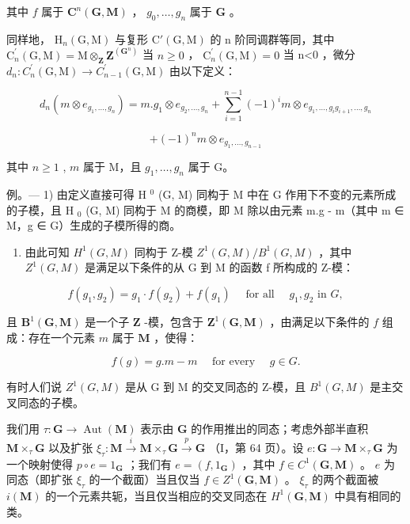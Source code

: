 其中 \(f\) 属于 \(\mathbf{C}^{n}(\mathbf{G},\mathbf{M})\) ， \(g_{0},\ldots,g_{n}\) 属于 \(\mathbf{G}\) 。

同样地， \(\mathrm{H}_{n}(\mathrm{G},\mathrm{M})\) 与复形 \(\mathrm{C}'(\mathrm{G},\mathrm{M})\) 的 n 阶同调群等同，其中 \(\mathrm{C}_{n}^{\prime}(\mathrm{G},\mathrm{M})=\mathrm{M}\otimes_{\mathbf{Z}}\mathbf{Z}^{(\mathbf{G}^{n})}\) 当 \(n\geqslant0\) ， \(\mathrm{C}_{n}^{\prime}(\mathrm{G},\mathrm{M})=0\) 当 n\textless0 ，微分 \(d_{n}:C_{n}^{\prime}(\mathrm{G},\mathrm{M})\to C_{n-1}^{\prime}(\mathrm{G},\mathrm{M})\) 由以下定义：

\[
d _ {n} (m \otimes e _ {g _ {1}, \dots , g _ {n}}) = m. g _ {1} \otimes e _ {g _ {2}, \dots , g _ {n}} + \sum_ {i = 1} ^ {n - 1} (- 1) ^ {i} m \otimes e _ {g _ {1}, \dots , g _ {i} g _ {i + 1}, \dots , g _ {n}}
\]

\[
+ (- 1) ^ {n} m \otimes e _ {g _ {1}, \dots , g _ {n - 1}}
\]

其中 \(n \geqslant 1\) , \(m\) 属于 M，且 \(g_1, \ldots, g_n\) 属于 G。

例。--- 1) 由定义直接可得 H \(^{0}\) (G, M) 同构于 M 中在 G 作用下不变的元素所成的子模，且 H \(_{0}\) (G, M) 同构于 M 的商模，即 M 除以由元素 m.g - m（其中 m ∈ M，g ∈ G）生成的子模所得的商。

\begin{enumerate}
\def\labelenumi{\arabic{enumi})}
\setcounter{enumi}{1}
\tightlist
\item
  由此可知 \(H^{1}(G, M)\) 同构于 Z-模 \(Z^{1}(G, M)/B^{1}(G, M)\) ，其中 \(Z^{1}(G, M)\) 是满足以下条件的从 G 到 M 的函数 f 所构成的 Z-模：
\end{enumerate}

\[
f \left(g _ {1}, g _ {2}\right) = g _ {1} \cdot f \left(g _ {2}\right) + f \left(g _ {1}\right) \quad \text { for   all } \quad g _ {1}, g _ {2} \text { in } G,
\]

且 \(\mathbf{B}^{1}(\mathbf{G},\mathbf{M})\) 是一个子 \(\mathbf{Z}\) -模，包含于 \(\mathbf{Z}^{1}(\mathbf{G},\mathbf{M})\) ，由满足以下条件的 \(f\) 组成：存在一个元素 \(m\) 属于 \(\mathbf{M}\) ，使得：

\[
f (g) = g. m - m \quad \text { for   every } \quad g \in G.
\]

有时人们说 \(Z^{1}(G, M)\) 是从 G 到 M 的交叉同态的 Z-模，且 \(B^{1}(G, M)\) 是主交叉同态的子模。

我们用 \(\tau: \mathbf{G} \to \operatorname{Aut}(\mathbf{M})\) 表示由 \(\mathbf{G}\) 的作用推出的同态；考虑外部半直积 \(\mathbf{M} \times_{\tau} \mathbf{G}\) 以及扩张 \(\xi_{\tau}: \mathbf{M} \xrightarrow{i} \mathbf{M} \times_{\tau} \mathbf{G} \xrightarrow{p} \mathbf{G}\) （I，第 64 页）。设 \(e: \mathbf{G} \to \mathbf{M} \times_{\tau} \mathbf{G}\) 为一个映射使得 \(p \circ e = 1_{\mathbf{G}}\) ；我们有 \(e = (f, 1_{\mathbf{G}})\) ，其中 \(f \in C^{1}(\mathbf{G}, \mathbf{M})\) 。 \(e\) 为同态（即扩张 \(\xi_{\tau}\) 的一个截面）当且仅当 \(f \in Z^{1}(\mathbf{G}, \mathbf{M})\) 。 \(\xi_{\tau}\) 的两个截面被 \(i(\mathbf{M})\) 的一个元素共轭，当且仅当相应的交叉同态在 \(H^{1}(\mathbf{G}, \mathbf{M})\) 中具有相同的类。

